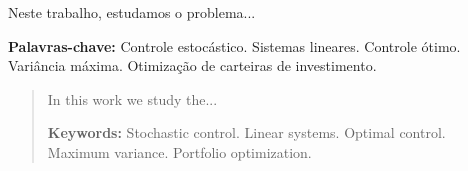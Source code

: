 \begin{summary}

Neste trabalho, estudamos o problema...

\vspace{1\baselineskip}

\textbf{Palavras-chave:} Controle estoc\' astico. Sistemas lineares. Controle \' otimo. Vari\^ ancia m\' axima. Otimiza\c c\~ao de carteiras de investimento.

\end{summary}


\begin{abstract}

In this work we study the...

\vspace{1\baselineskip}

\textbf{Keywords:} Stochastic control. Linear systems. Optimal control. Maximum variance. Portfolio optimization.

\end{abstract}
